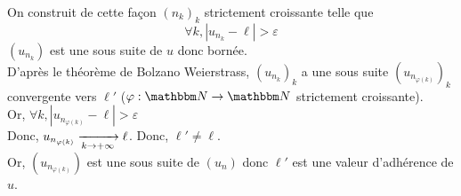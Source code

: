 \begin{enumerate}
		On construit de cette façon $(n_k)_{k}$ strictement croissante telle que \[
			\forall k, \left| u_{n_k} - \ell \right| > \varepsilon
		\]
		$(u_{n_k})$ est une sous suite de $u$ donc bornée.\\
		D'après le théorème de Bolzano Weierstrass, $\left(u_{n_k}\right)_k$ a une sous suite $\left( u_{n_{\varphi(k)}} \right)_k$ convergente vers $\ell'$ ($\varphi: \N \to \N$ strictement croissante).\\
		Or, $\forall k, \left| u_{n_{\varphi(k)}} -\ell \right| > \varepsilon$ \\
		Donc, $u_{n_{\varphi(k)}} \xrightarrow[k \to +\infty]{} \ell$. Donc, $\ell' \neq \ell$.\\
		Or, $\left( u_{n_{\varphi(k)}} \right)$ est une sous suite de $(u_n)$ donc $\ell'$ est une valeur d'adhérence de $u$.
\end{enumerate}
